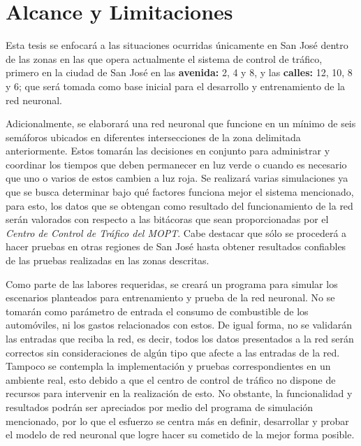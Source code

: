 \section{Alcance y Limitaciones}
		
		
		Esta tesis se enfocar\'{a} a las situaciones ocurridas \'{u}nicamente en San Jos\'{e}
	dentro de las zonas en las que opera actualmente el sistema de control de
	tr\'{a}fico, primero en la ciudad de San Jos\'{e} en las \textbf{avenida:} 2, 4
	y 8,  y las \textbf{calles:} 12, 10, 8 y 6; que ser\'{a} tomada como base inicial para el
	desarrollo y entrenamiento de la red neuronal.
	
		Adicionalmente, se elaborar\'{a} una red neuronal que funcione en un m\'{i}nimo de
	seis sem\'{a}foros ubicados en diferentes intersecciones de la zona delimitada
	anteriormente. Estos tomar\'{a}n las decisiones en conjunto para administrar y
	coordinar los tiempos que deben permanecer en luz verde o cuando es necesario
	que uno o varios de estos cambien a luz roja. Se realizar\'{a} varias
	simulaciones ya que se busca determinar bajo qu\'{e} factores funciona mejor el
	sistema mencionado, para esto, los datos que se obtengan como resultado del
	funcionamiento de la red ser\'{a}n valorados con respecto a las bit\'{a}coras
	que sean proporcionadas por el \textit{Centro de Control de Tr\'{a}fico del
	MOPT}.
	Cabe destacar que s\'{o}lo se proceder\'{a} a hacer pruebas en otras regiones de San Jos\'{e} hasta obtener resultados confiables de las pruebas realizadas en las zonas descritas.
	
		Como parte de las labores requeridas, se crear\'{a} un programa para simular los
	escenarios planteados para entrenamiento y prueba de la red neuronal. No se
	tomar\'{a}n como par\'{a}metro de entrada el consumo de combustible de los autom\'{o}viles,
	ni los gastos relacionados con estos. De igual forma, no se validar\'{a}n las
	entradas que reciba la red, es decir, todos los datos presentados a la red ser\'{a}n correctos sin consideraciones de alg\'{u}n tipo que afecte a las entradas de la red. Tampoco se contempla la implementaci\'{o}n y pruebas correspondientes en un ambiente real, esto debido a que el centro de control de tr\'{a}fico no dispone de recursos para intervenir en la realizaci\'{o}n de esto. No obstante, la funcionalidad y resultados podr\'{a}n ser apreciados por medio del programa de simulaci\'{o}n mencionado, por lo que el esfuerzo se centra m\'{a}s en definir, desarrollar y probar el modelo de red neuronal que logre hacer su cometido de la mejor forma posible.
	
